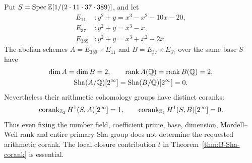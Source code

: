 \begin{proposition}
\label{prop:B-paired-corank}
Put \(S=\operatorname{Spec}\mathbb Z[1/(2\cdot11\cdot37\cdot389)]\), and let
\[
\begin{aligned}
 E_{11}&:y^2+y=x^3-x^2-10x-20,\\
 E_{37}&:y^2+y=x^3-x,\\
 E_{389}&:y^2+y=x^3+x^2-2x.
\end{aligned}
\]
The abelian schemes
\(A=E_{389}\times E_{11}\) and \(B=E_{37}\times E_{37}\)
over the same base \(S\) have
\[
\begin{gathered}
 \dim A=\dim B=2,\qquad
 \operatorname{rank}A(\mathbb Q)=\operatorname{rank}B(\mathbb Q)=2,\\
 \mathop{\mathrm{Sha}}(A/\mathbb Q)[2^\infty]=\mathop{\mathrm{Sha}}(B/\mathbb Q)[2^\infty]=0.
\end{gathered}
\]
Nevertheless their arithmetic cohomology groups have distinct
coranks:
\[
 \operatorname{corank}_{\mathbb Z_2}H^1(S,A)[2^\infty]=1,
 \qquad
 \operatorname{corank}_{\mathbb Z_2}H^1(S,B)[2^\infty]=0.
\]
Thus even fixing the number field, coefficient prime, base,
dimension, Mordell--Weil rank and entire primary Sha group does
not determine the requested arithmetic corank.  The local closure
contribution \(t\) in Theorem~\ref{thm:B-Sha-corank} is essential.
\end{proposition}

